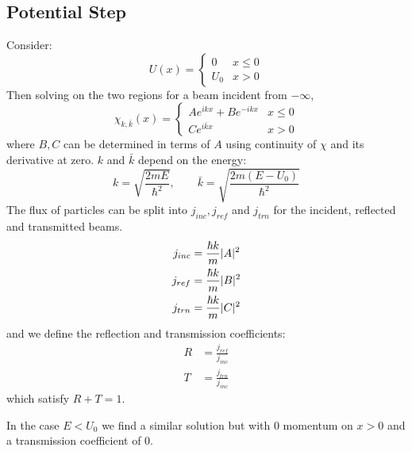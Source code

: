 \documentclass[../Main.tex]{subfiles}
\begin{document}
\subsection{Potential Step}
Consider:
\begin{equation*}
    U(x) =
    \begin{cases}
        0 & x \leq 0 \\
        U_0 & x > 0
    \end{cases}
\end{equation*}
Then solving on the two regions for a beam incident from $-\infty$,
\begin{equation*}
    \chi_{k, \bar{k}}(x) =
    \begin{cases}
        Ae^{ikx} + Be^{-ikx} & x \leq 0 \\
        Ce^{i\bar{k}x} & x > 0
    \end{cases}
\end{equation*}
where $B, C$ can be determined in terms of $A$ using continuity of $\chi$ and its derivative at zero. $k$ and $\bar{k}$ depend on the energy:
\begin{equation*}
    k = \sqrt{\frac{2mE}{\hbar^2}},\qquad \bar{k} = \sqrt{\frac{2m(E - U_0)}{\hbar^2}}
\end{equation*}
The flux of particles can be split into $j_{inc}, j_{ref}$ and $j_{trn}$ for the incident, reflected and transmitted beams.
\begin{align*}
    j_{inc} &= \frac{\hbar k}{m} \lvert A\rvert^2 \\
    j_{ref} &= \frac{\hbar k}{m} \lvert B\rvert^2 \\
    j_{trn} &= \frac{\hbar k}{m} \lvert C\rvert^2 \\
\end{align*}
and we define the reflection and transmission coefficients:
\begin{align*}
    R &= \frac{j_{ref}}{j_{inc}} \\
    T &= \frac{j_{trn}}{j_{inc}}
\end{align*}
which satisfy $R + T = 1$.

In the case $E < U_0$ we find a similar solution but with $0$ momentum on $x > 0$ and a transmission coefficient of $0$.
\end{document}

